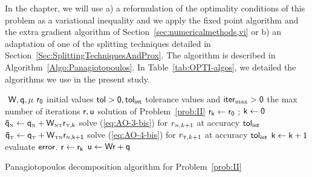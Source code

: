 In the chapter, we will use a) a reformulation of the optimality conditions of this problem as a variational inequality and we apply the fixed point algorithm and the extra gradient algorithm of Section~\ref{sec:numericalmethods,vi} or b) an adaptation of one of the splitting techniques detailed in Section~\ref{Sec:SplittingTechniquesAndProx}. The algorithm is described in Algorithm~\ref{Algo:Panagiotopoulos}.
In Table~\ref{tab:OPTI-algos}, we detailed the algorithms we use in the present study.

\begin{algorithm}
  \begin{algorithmic}
    {\sf
      \STATE $ $ 
      \REQUIRE $\sf W,q,\mu$
      \REQUIRE $\sf r_0$ initial values
      \REQUIRE $\sf tol >0, tol_{{int}}$  tolerance values and $\sf iter_{\max}  >0$ the max number of iterations
      \ENSURE  $\sf r,u$ solution of Problem~\ref{prob:II}
      \STATE $\sf r_{k} \leftarrow r_0 $ ; $\sf k \leftarrow 0$ 
      \STATE $\sf \tilde q_{\hbox{\tiny{N}}} \leftarrow q_{\hbox{\tiny{N}}} + W_{{\hbox{\tiny{N}}}{\hbox{\tiny{T}}}}r_{{\hbox{\tiny{T}}},k}$
      \STATE solve (\ref{eq:AO-3-bis}) for $r_{{\hbox{\tiny{N}}},k+1}$ at accuracy $\sf tol_{{int}}$
      \STATE $\sf  \tilde q_{\hbox{\tiny{T}}} \leftarrow q_{\hbox{\tiny{T}}} + W_{{\hbox{\tiny{T}}}{\hbox{\tiny{N}}}}r_{{\hbox{\tiny{N}}},k+1}$
      \STATE solve (\ref{eq:AO-4-bis}) for $r_{{\hbox{\tiny{T}}},k+1}$ at accuracy $\sf tol_{{int}}$
      \STATE $\sf k \leftarrow k+1$
      \STATE evaluate $\sf error$.
      \ENDWHILE
      \STATE $\sf r \leftarrow r_{k}$ 
      \STATE $\sf u \leftarrow W r + q$ 
    }
  \end{algorithmic}
  \caption{Panagiotopoulos decomposition algorithm for Problem~\ref{prob:II}}  \label{Algo:Panagiotopoulos}
\end{algorithm}


